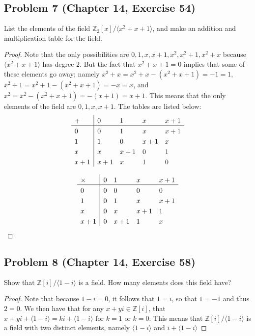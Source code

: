 \documentclass{article}
\begin{document}
\subsection*{Problem 7 (Chapter 14, Exercise 54)}
List the elements of the field $\mathbb{Z}_2[x]/\langle x^2 + x + 1 \rangle$, and make an addition and multiplication table for the field.
\begin{proof}
Note that the only possibilities are $0, 1, x, x + 1, x^2, x^2 + 1, x^2 + x$ because $\langle x^2 + x + 1 \rangle$ has degree 2. But the fact that $x^2 + x + 1 = 0$ implies that some of these elements go away; namely $x^2 + x = x^2 + x - (x^2 + x + 1) = -1 = 1$, $x^2 + 1 = x^2 + 1 - (x^2 + x + 1) = -x = x$, and $x^2 = x^2 - (x^2 + x + 1) = -(x+1) = x+1$. This means that the only elements of the field are $0, 1, x, x+1$. The tables are listed below:
\[
    \setlength{\extrarowheight}{3pt}
    \begin{array}{l|*{4}{l}}
     +  & 0   & 1   & x  & x+1  \\
    \hline
    0   & 0   & 1   & x  & x+1  \\
    1   & 1   & 0   & x+1 & x  \\
    x   & x   & x+1  & 0  & 1  \\
    x+1  & x+1  & x   & 1  & 0  \\
    \end{array} 
\]

\[
    \setlength{\extrarowheight}{3pt}
    \begin{array}{l|*{4}{l}}
     \times  & 0   & 1   & x  & x+1  \\
    \hline
    0   & 0   & 0   & 0  & 0  \\
    1   & 0   & 1   & x & x+1  \\
    x   & 0   & x  & x+1  & 1  \\
    x+1  & 0  & x+1   & 1  & x  \\
    \end{array} 
\]

\end{proof}

\subsection*{Problem 8 (Chapter 14, Exercise 58)}
Show that $\mathbb{Z}[i]/\langle 1 - i \rangle$ is a field. How many elements does this field have? 
\begin{proof}
Note that because $1 - i = 0$, it follows that $1 = i$, so that $1 = -1$ and thus $2 = 0$. We then have that for any $x + yi \in \mathbb{Z}[i]$, that $x + yi + \langle 1 - i \rangle = ki + \langle 1 - i \rangle$ for $k = 1$ or $k = 0$. This means that $\mathbb{Z}[i]/\langle 1 - i \rangle$ is a field with two distinct elements, namely $\langle 1 - i \rangle$ and $i + \langle 1 - i \rangle$
\end{proof}
\end{document}
